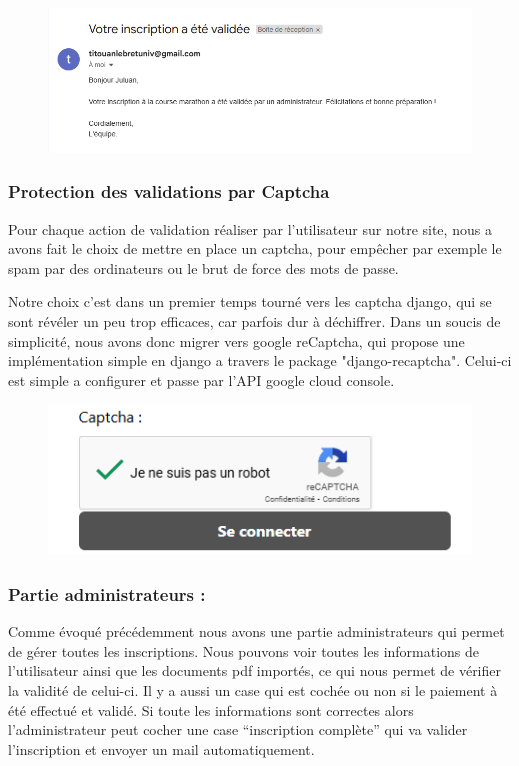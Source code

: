 \documentclass[12pt]{article} %
\begin{document}
            \begin{figure}[hbtp]
            \centering
            \includegraphics[scale=0.8]{images/validationMAIL.PNG}
            \end{figure}

        \subsubsection{Protection des validations par Captcha}
            Pour chaque action de validation réaliser par l'utilisateur sur notre site, nous a avons fait le choix de mettre en place un captcha, pour empêcher par exemple le spam par des ordinateurs ou le brut de force des mots de passe.
            
            Notre choix c'est dans un premier temps tourné vers les captcha django, qui se sont révéler un peu trop efficaces, car parfois dur à déchiffrer. Dans un soucis de simplicité, nous avons donc migrer vers google reCaptcha, qui propose une implémentation simple en django a travers le package "django-recaptcha". Celui-ci est simple a configurer et passe par l'API google cloud console.
            \begin{figure}[hbtp]
            \centering
            \includegraphics[scale=0.8]{images/Capture_captcha.PNG}
            \end{figure}
            
        \subsubsection{Partie administrateurs :}
            Comme évoqué précédemment nous avons une partie administrateurs qui permet de gérer toutes les inscriptions. Nous pouvons voir toutes les informations de l'utilisateur ainsi que les documents pdf importés, ce qui nous permet de vérifier la validité de celui-ci. Il y a aussi un case qui est cochée ou non si le paiement à été effectué et validé. Si toute les informations sont correctes alors l'administrateur peut cocher une case “inscription complète” qui va valider l’inscription et envoyer un mail automatiquement.
\end{document}
